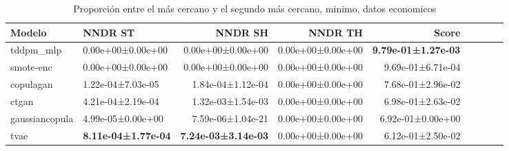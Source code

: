 \begin{table}[H]
\centering
\fontsize{10}{14}\selectfont
\caption{Proporción entre el más cercano y el segundo más cercano, minimo, datos economicos}
\label{table-nndr-economicos-a-min}
\begin{tabular}{|l|l|r|r|r|r|r|r|r|}
\hline
\rowcolor[gray]{0.8}
Modelo & NNDR ST & NNDR SH & NNDR TH & \textbf{Score} \\
\hline tddpm\_mlp & \cellcolor[rgb]{0.9, 0.54, 0.52} 0.00e+00±0.00e+00 & \cellcolor[rgb]{0.9, 0.54, 0.52} 0.00e+00±0.00e+00 & 0.00e+00±0.00e+00 & \bfseries 9.79e-01±1.27e-03 \\
\hline smote-enc & \cellcolor[rgb]{0.9, 0.54, 0.52} 0.00e+00±0.00e+00 & \cellcolor[rgb]{0.9, 0.54, 0.52} 0.00e+00±0.00e+00 & 0.00e+00±0.00e+00 & 9.69e-01±6.71e-04 \\
\hline copulagan & 1.22e-04±7.03e-05 & 1.84e-04±1.12e-04 & 0.00e+00±0.00e+00 & 7.68e-01±2.96e-02 \\
\hline ctgan & 4.21e-04±2.19e-04 & 1.32e-03±1.54e-03 & 0.00e+00±0.00e+00 & 6.98e-01±2.63e-02 \\
\hline gaussiancopula & 4.99e-05±0.00e+00 & 7.59e-06±1.04e-21 & 0.00e+00±0.00e+00 & 6.92e-01±0.00e+00 \\
\hline tvae & \bfseries 8.11e-04±1.77e-04 & \bfseries 7.24e-03±3.14e-03 & 0.00e+00±0.00e+00 & \cellcolor[rgb]{0.9, 0.54, 0.52} 6.12e-01±2.50e-02 \\
\hline
\end{tabular}
\end{table}
